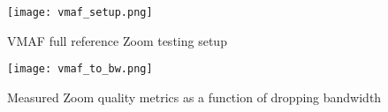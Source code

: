 
\begin{figure}
    \centering
    \texttt{[image: vmaf\_setup.png]}
    \caption{VMAF full reference Zoom testing setup}
    \label{fig:vmaf-setup}
\end{figure}

\begin{figure}
    \centering
    \texttt{[image: vmaf\_to\_bw.png]}
    \caption{Measured Zoom quality metrics as a function of dropping bandwidth}
    \label{fig:qual-metrics}
\end{figure}


